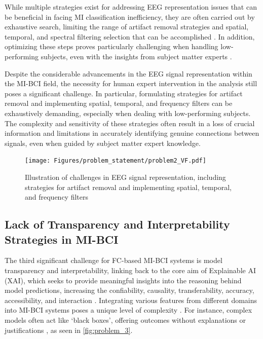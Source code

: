 While multiple strategies exist for addressing EEG representation issues that can be beneficial in facing MI classification inefficiency, they are often carried out by exhaustive search, limiting the range of artifact removal strategies and spatial, temporal, and spectral filtering selection that can be accomplished \cite{saha2020intra, ismail2020graph, meers2020motor, talukdar2019motor}. In addition, optimizing these steps proves particularly challenging when handling low-performing subjects, even with the insights from subject matter experts \cite{vidaurre2020sensorimotor}.

Despite the considerable advancements in the EEG signal representation within the MI-BCI field, the necessity for human expert intervention in the analysis still poses a significant challenge. In particular, formulating strategies for artifact removal and implementing spatial, temporal, and frequency filters can be exhaustively demanding, especially when dealing with low-performing subjects. The complexity and sensitivity of these strategies often result in a loss of crucial information and limitations in accurately identifying genuine connections between signals, even when guided by subject matter expert knowledge.

\begin{figure}[!h]
    \centering
    \texttt{[image: Figures/problem\_statement/problem2\_VF.pdf]}
    \caption{Illustration of challenges in EEG signal representation, including strategies for artifact removal and implementing spatial, temporal, and frequency filters \label{fig:problem_2}}
\end{figure}


\subsection{Lack of Transparency and Interpretability Strategies in MI-BCI \label{sec:problem3}}

The third significant challenge for FC-based MI-BCI systems is model transparency and interpretability, linking back to the core aim of Explainable AI (XAI), which seeks to provide meaningful insights into the reasoning behind model predictions, increasing the confiability, causality, transferability, accuracy, accessibility, and interaction \cite{smuha2019eu}. Integrating various features from different domains into MI-BCI systems poses a unique level of complexity \cite{guillot2019benefits}. For instance, complex models often act like ‘black boxes’, offering outcomes without explanations or justifications \cite{ras2018explanation}, as seen in \cref{fig:problem_3}.

